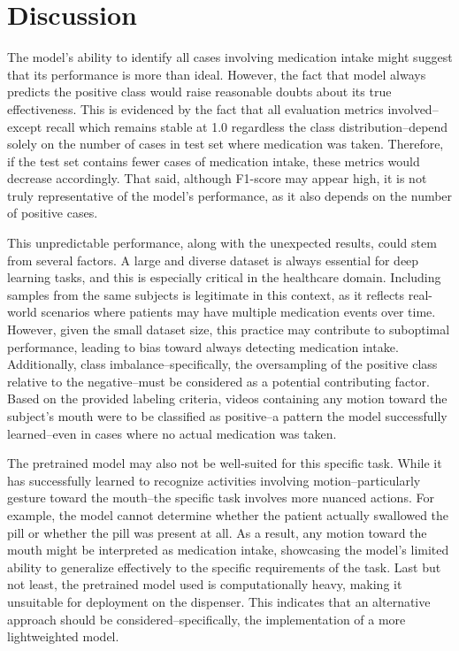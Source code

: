 \documentclass[a4paper,12pt]{article}
\begin{document}
\section{Discussion}
The model's ability to identify all cases involving medication intake might suggest that its performance is more than ideal. 
However, the fact that model always predicts the positive class would raise reasonable doubts about its true effectiveness. 
This is evidenced by the fact that all evaluation metrics involved--except recall which remains stable at 1.0 regardless the
 class distribution--depend solely on the number of cases in test set where medication was taken. Therefore, if the test set 
 contains fewer cases of medication intake, these metrics would decrease accordingly. That said, although F1-score may appear high, 
 it is not truly representative of the model's performance, as it also depends on the number of positive cases.

This unpredictable performance, along with the unexpected results, could stem from several factors. A large and diverse
 dataset is always essential for deep learning tasks, and this is especially critical in the healthcare domain. Including 
 samples from the same subjects is legitimate in this context, as it reflects real-world scenarios where patients may have 
 multiple medication events over time. However, given the small dataset size, this practice may contribute to suboptimal 
 performance, leading to bias toward always detecting medication intake. Additionally, class imbalance--specifically, the 
 oversampling of the positive class relative to the negative--must be considered as a potential contributing factor. Based 
 on the provided labeling criteria, videos containing any motion toward the subject's mouth were to be classified as 
 positive--a pattern the model successfully learned--even in cases where no actual medication was taken. 

The pretrained model may also not be well-suited for this specific task. While it has successfully learned to recognize 
activities involving motion--particularly gesture toward the mouth--the specific task involves more nuanced actions. For 
example, the model cannot determine whether the patient actually swallowed the pill or whether the pill was present at all. 
As a result, any motion toward the mouth might be interpreted as medication intake, showcasing the model's limited ability 
to generalize effectively to the specific requirements of the task. Last but not least, the pretrained model used is 
computationally heavy, making it unsuitable for deployment on the dispenser. This indicates that an alternative approach 
should be considered--specifically, the implementation of a more lightweighted model.
\end{document}
